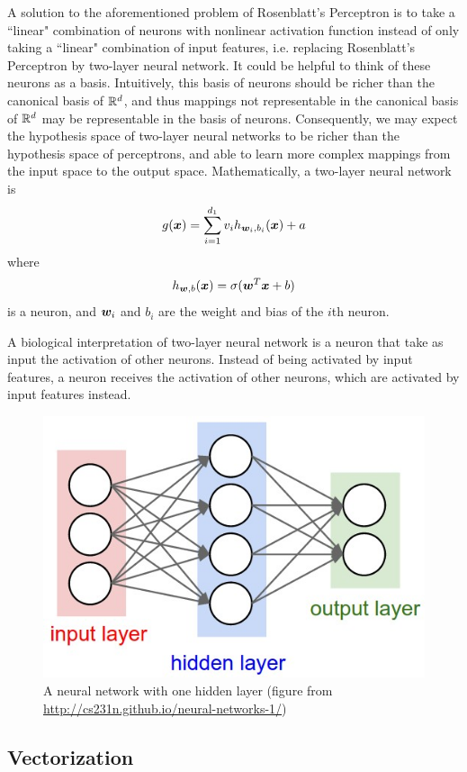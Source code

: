 \documentclass{article}
\begin{document}
A solution to the aforementioned problem of Rosenblatt's Perceptron is to take a ``linear" combination of neurons with nonlinear activation function instead of only taking a ``linear" combination of input features, i.e. replacing Rosenblatt's Perceptron by two-layer neural network.
It could be helpful to think of these neurons as a basis.
Intuitively, this basis of neurons should be richer than the canonical basis of ${\mathbb R}^d$, and thus mappings not representable in the canonical basis of ${\mathbb R}^d$ may be representable in the basis of neurons.
Consequently, we may expect the hypothesis space of two-layer neural networks to be richer than the hypothesis space of perceptrons, and able to learn more complex mappings from the input space to the output space.
Mathematically, a two-layer neural network is
\[
g({\bm x}) = \sum_{i = 1}^{d_1} v_i h_{{\bm w}_i, b_i} ({\bm x}) + a
\]
where
\[
h_{{\bm w}, b} ({\bm x}) = \sigma({\bm w}^T {\bm x} + b)
\]
is a neuron, and ${\bm w}_i$ and $b_i$ are the weight and bias of the $i$th neuron.

A biological interpretation of two-layer neural network is a neuron that take as input the activation of other neurons.
Instead of being activated by input features, a neuron receives the activation of other neurons, which are activated by input features instead.

\begin{figure}
\centering
\includegraphics[scale=0.2, valign=t]{neural_net}
\caption{A neural network with one hidden layer (figure from \url{http://cs231n.github.io/neural-networks-1/})}
\end{figure}

\subsection{Vectorization}
\end{document}
